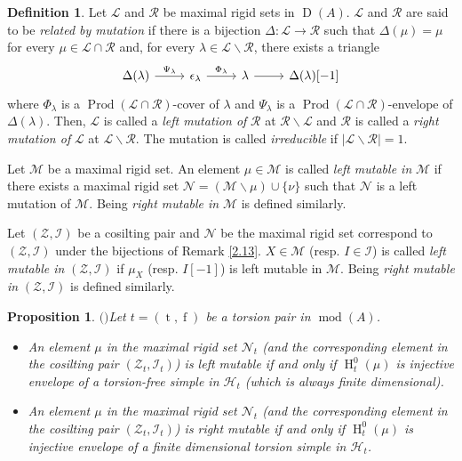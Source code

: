 \documentclass[12pt]{amsart}
\numberwithin{equation}{section}
\newtheorem{proposition}[lemma]{Proposition}
\theoremstyle{definition}
\newtheorem{definition}[lemma]{Definition}
\DeclareMathOperator{\modd}{mod}
\DeclareMathOperator{\D}{D}
\DeclareMathOperator{\ts}{t}
\DeclareMathOperator{\fs}{f}
\DeclareMathOperator{\HH}{H}
\DeclareMathOperator{\Prod}{Prod}
\newtheorem*{theorem 0*}{Theorem}
\newtheorem*{theorem a*}{Theorem A}
\newtheorem*{theorem b*}{Theorem B}
\numberwithin{diagram}{section}
\begin{document}
	\begin{definition}\cite[Definition 3.1]{ALS2}
	Let $\mathcal{L}$ and $\mathcal{R}$ be maximal rigid sets in $\D(A)$. $\mathcal{L}$ and $\mathcal{R}$ are said to be {\it related by mutation} if there is a bijection $\Delta:\mathcal{L}\rightarrow\mathcal{R}$ such that $\Delta(\mu)=\mu$ for every $\mu\in\mathcal{L}\cap\mathcal{R}$ and, for every $\lambda\in\mathcal{L}\backslash\mathcal{R}$, there exists a triangle 
	\[\begin{tikzcd}
	{\Delta(\lambda)} & {\epsilon_{\lambda}} & \lambda & {\Delta(\lambda)[-1]}
	\arrow["{\Psi_{\lambda}}", from=1-1, to=1-2]
	\arrow["{\Phi_{\lambda}}", from=1-2, to=1-3]
	\arrow[from=1-3, to=1-4]
\end{tikzcd}\]
where $\Phi_{\lambda}$ is a $\Prod(\mathcal{L}\cap\mathcal{R})$-cover of $\lambda$ and $\Psi_{\lambda}$ is a $\Prod(\mathcal{L}\cap\mathcal{R})$-envelope of $\Delta(\lambda)$.
Then, $\mathcal{L}$ is called a {\it left mutation of} $\mathcal{R}$ at $\mathcal{R}\backslash\mathcal{L}$ and $\mathcal{R}$ is called a {\it right mutation of} $\mathcal{L}$ at $\mathcal{L}\backslash\mathcal{R}$. The mutation is called {\it irreducible} if $\vert\mathcal{L}\backslash\mathcal{R} \vert=1$.

Let $\mathcal{M}$ be a maximal rigid set. An element $\mu\in\mathcal{M}$ is called {\it left mutable in} $\mathcal{M}$ if there exists a maximal rigid set $\mathcal{N}=(\mathcal{M}\backslash{\mu})\cup\{\nu\}$ such that $\mathcal{N}$ is a left mutation of $\mathcal{M}$. Being {\it right mutable in} $\mathcal{M}$ is defined similarly.

Let $(\mathcal{Z},\mathcal{I})$ be a cosilting pair and $\mathcal{N}$ be the maximal rigid set correspond to $(\mathcal{Z},\mathcal{I})$ under the bijections of Remark \ref{2.13}. $X\in\mathcal{M}$ (resp. $I\in\mathcal{I}$) is called {\it left mutable in} $(\mathcal{Z},\mathcal{I})$ if $\mu_X$ (resp. $I[-1]$) is left mutable in $\mathcal{M}$. Being {\it right mutable in} $(\mathcal{Z},\mathcal{I})$ is defined similarly.
\end{definition}
	
\begin{proposition}$($\cite[Corollary 3.10]{ALS2}$)$\label{3.13}
Let $t=(\ts,\fs)$ be a torsion pair in $\modd(A)$.
\begin{itemize}
\item[(1)]
An element $\mu$ in the maximal rigid set $\mathcal{N}_t$ (and the corresponding element in the cosilting pair $(\mathcal{Z}_t,\mathcal{I}_t)$) is left mutable if and only if $\HH^0_t(\mu)$ is injective envelope of a torsion-free simple in $\mathcal{H}_t$ (which is always finite dimensional).
\item[(2)]
An element $\mu$ in the maximal rigid set $\mathcal{N}_t$ (and the corresponding element in the cosilting pair $(\mathcal{Z}_t,\mathcal{I}_t)$) is right mutable if and only if $\HH^0_t(\mu)$ is injective envelope of a finite dimensional torsion simple in $\mathcal{H}_t$.
\end{itemize}
\end{proposition}
\end{document}
